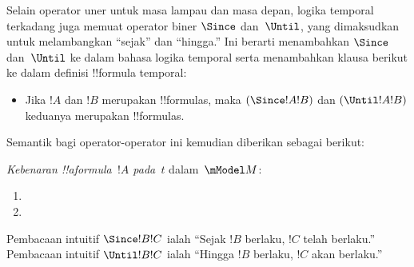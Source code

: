 \documentclass[../../../include/open-logic-section]{subfiles}
\begin{document}


Selain operator uner untuk masa lampau dan masa depan, logika temporal
terkadang juga memuat operator biner $\Since$ dan~$\Until$, yang dimaksudkan
untuk melambangkan ``sejak'' dan ``hingga.'' Ini berarti menambahkan $\Since$
dan~$\Until$ ke dalam bahasa logika temporal serta menambahkan klausa berikut
ke dalam definisi !!{formula} temporal:

\begin{itemize}
\item[] Jika $!A$ dan $!B$ merupakan !!{formula}s, maka $(\Since !A !B)$ dan
  $(\Until !A !B)$ keduanya merupakan !!{formula}s.
\end{itemize}

Semantik bagi operator-operator ini kemudian diberikan sebagai berikut:

\begin{defn}
  \emph{Kebenaran !!a{formula}~$!A$ pada~$t$} dalam~$\mModel M$:
  \begin{enumerate}
  \item{} 
  \item{} 
  \end{enumerate}
\end{defn}

Pembacaan intuitif $\Since !B !C$ ialah ``Sejak $!B$ berlaku, $!C$ telah
berlaku.'' Pembacaan intuitif $\Until !B !C$ ialah ``Hingga $!B$ berlaku,
$!C$ akan berlaku.''
\end{document}
